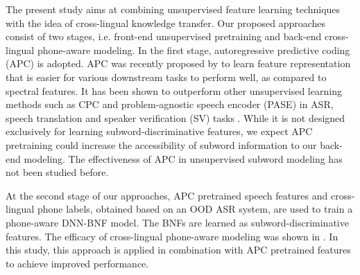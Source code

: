 \documentclass[a4paper]{article}
\begin{document}
The present study aims at combining unsupervised feature learning techniques with the idea of cross-lingual   knowledge transfer. Our proposed approaches consist of two stages, i.e. front-end unsupervised pretraining and back-end cross-lingual phone-aware  modeling. 
In the first stage, autoregressive predictive coding (APC) is adopted.
APC was recently proposed by \cite{Chung2019} to  learn feature representation that is easier  for  various downstream tasks to perform well, as compared to spectral features. 
It has been shown to outperform other  unsupervised learning methods such as CPC \cite{oord2018cpc} and problem-agnostic speech encoder (PASE) \cite{Pascual2019} in ASR, speech translation and speaker verification (SV)  tasks \cite{Chung2019generative}.
While it is not designed exclusively for learning subword-discriminative features, we expect APC 
pretraining could increase the accessibility of subword information to our back-end modeling.
The effectiveness of APC in unsupervised subword modeling has not been studied before.

At the second stage of our approaches, APC pretrained speech features and cross-lingual phone labels, obtained based on an OOD ASR system,  are used to train a phone-aware DNN-BNF model. The BNFs are learned  as subword-discriminative features. The efficacy of cross-lingual phone-aware  modeling was shown in \cite{feng2018exploiting,feng2019_TASLP}. In this study, this approach is applied in combination with APC pretrained features to achieve improved performance.
\end{document}
